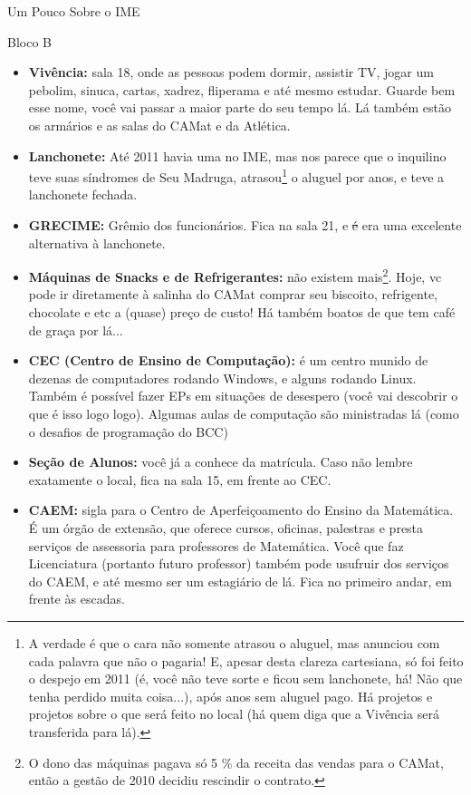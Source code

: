 \begin{secao}{Um Pouco Sobre o IME}
\begin{subsecao}{Bloco B}
\begin{itemize}
\item {\bf Vivência:} sala 18, onde as pessoas podem dormir, assistir TV,
  jogar um pebolim, sinuca, cartas, xadrez, fliperama e até mesmo estudar.
  Guarde bem esse nome, você vai passar a maior parte do seu tempo lá.
  Lá também estão os armários e as salas do CAMat e da Atlética. 



\item {\bf Lanchonete:} Até 2011 havia uma no IME, mas nos parece que o inquilino teve suas síndromes de Seu Madruga, atrasou\footnote{A verdade é que o cara não somente atrasou o aluguel, mas anunciou com cada palavra que não o pagaria! E, apesar desta clareza cartesiana, só foi feito o despejo em 2011 (é, você não teve sorte e ficou sem lanchonete, há! Não que tenha perdido muita coisa...), após anos sem aluguel pago. Há projetos e projetos sobre o que será feito no local (há quem diga que a Vivência será transferida para lá).} o aluguel por anos, e teve a lanchonete fechada. 


\item {\bf GRECIME:} Grêmio dos funcionários. Fica na sala 21, e \sout {é} era uma excelente  alternativa à lanchonete.

\item {\bf Máquinas de Snacks e de Refrigerantes:} não existem mais\footnote{O dono das máquinas pagava só 5 \%  da receita das vendas para o CAMat, então a gestão de 2010 decidiu rescindir o contrato. }. Hoje, vc pode ir diretamente à salinha do CAMat comprar seu biscoito, refrigente, chocolate e etc a (quase) preço de custo! Há também boatos de que tem café de graça por lá... 

\item {\bf CEC (Centro de Ensino de Computação):} é um centro munido de
  dezenas de computadores rodando Windows, e alguns rodando Linux. Também
  é possível fazer EPs em situações de desespero (você vai descobrir o que é isso logo logo). Algumas
  aulas de computação são ministradas lá (como o desafios de programação do BCC)
 
\item {\bf Seção de Alunos:} você já a conhece da matrícula. Caso não lembre
  exatamente o local, fica na sala 15, em frente ao CEC.

\item {\bf CAEM:} sigla para o Centro de Aperfeiçoamento do Ensino da Matemática.
  É um órgão de extensão, que oferece cursos, oficinas, palestras e presta serviços
  de assessoria para professores de Matemática. Você que faz Licenciatura (portanto
  futuro professor) também pode usufruir dos serviços do CAEM, e até mesmo ser um
  estagiário de lá. Fica no primeiro andar, em frente às escadas.


\end{itemize}
\end{subsecao}
\end{secao}

